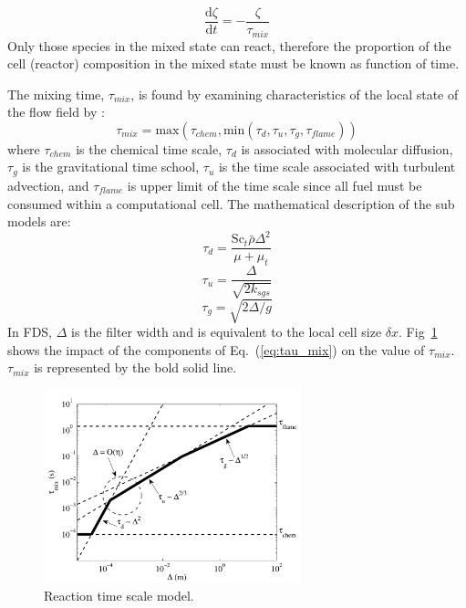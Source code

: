 \begin{equation}\label{eq:zeta}
\frac{\mbox{d}\zeta}{\mbox{d}t}=-\frac{\zeta}{\tau_{mix}}
\end{equation}     
Only those species in the mixed state can react, therefore the proportion of the cell (reactor) composition in the mixed state must be known as function of time. 

The mixing time, $\tau_{mix}$, is found by examining characteristics of the local state of the flow field by \cite{McDermott:2011}:
\begin{equation}\label{eq:tau_mix}
\tau_{mix}=\mbox{max}(\tau_{chem},\mbox{min}(\tau_{d},\tau_{u},\tau_{g},\tau_{flame}))
\end{equation}
where $\tau_{chem}$ is the chemical time scale, $\tau_{d}$ is associated with molecular diffusion, $\tau_{g}$ is the gravitational time school, $\tau_{u}$ is the time scale associated with turbulent advection, and $\tau_{flame}$ is upper limit of the time scale since all fuel must be consumed within a computational cell. The mathematical description of the sub models are:
\begin{equation}\label{eq:tau_d}
\tau_{d}=\frac{\mbox{Sc}_{t}\bar{\rho}\Delta^2}{\mu+\mu_{t}}
\end{equation}
\begin{equation}\label{eq:tau_u}
\tau_{u}=\frac{\Delta}{\sqrt{2k_{sgs}}}
\end{equation}
\begin{equation}\label{eq:tau_g}
\tau_{g}=\sqrt{2\Delta/g}
\end{equation}
In FDS, $\Delta$ is the filter width and is equivalent to the local cell size $\delta x$. Fig~\ref{fig:reac_time_scale} shows the impact of the components of Eq.~(\ref{eq:tau_mix}) on the value of $\tau_{mix}$. $\tau_{mix}$ is represented by the bold solid line.

\begin{figure}[h!]
\begin{center}
\includegraphics[height=2.2in]{FIGURES/reaction_time_scale}
\caption{\label{fig:reac_time_scale} Reaction time scale model.}
\end{center}
\end{figure}

